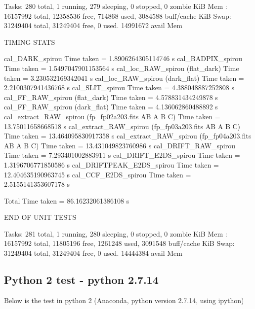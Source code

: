 \begin{cmdboxprint}
Tasks: 280 total,   1 running, 279 sleeping,   0 stopped,   0 zombie
KiB Mem : 16157992 total, 12358536 free,   714868 used,  3084588 buff/cache
KiB Swap: 31249404 total, 31249404 free,        0 used. 14991672 avail Mem

TIMING STATS

cal_DARK_spirou Time taken = 1.8906264305114746 s
cal_BADPIX_spirou Time taken = 1.5497047901153564 s
cal_loc_RAW_spirou (flat_dark) Time taken = 3.230532169342041 s
cal_loc_RAW_spirou (dark_flat) Time taken = 2.2100307941436768 s
cal_SLIT_spirou Time taken = 4.388048887252808 s
cal_FF_RAW_spirou (flat_dark) Time taken = 4.578831434249878 s
cal_FF_RAW_spirou (dark_flat) Time taken = 4.136062860488892 s
cal_extract_RAW_spirou (fp_fp02a203.fits AB A B C) Time taken = 13.75011658668518 s
cal_extract_RAW_spirou (fp_fp03a203.fits AB A B C) Time taken = 13.464095830917358 s
cal_extract_RAW_spirou (fp_fp04a203.fits AB A B C) Time taken = 13.431049823760986 s
cal_DRIFT_RAW_spirou Time taken = 7.293401002883911 s
cal_DRIFT_E2DS_spirou Time taken = 1.3196706771850586 s
cal_DRIFTPEAK_E2DS_spirou Time taken = 12.404635190963745 s
cal_CCF_E2DS_spirou Time taken = 2.5155141353607178 s

Total Time taken = 86.16232061386108 s

END OF UNIT TESTS

Tasks: 281 total,   1 running, 280 sleeping,   0 stopped,   0 zombie
KiB Mem : 16157992 total, 11805196 free,  1261248 used,  3091548 buff/cache
KiB Swap: 31249404 total, 31249404 free,        0 used. 14444384 avail Mem
\end{cmdboxprint}

\subsection{Python 2 test - python 2.7.14}

Below is the test in python 2 (Anaconda, python version 2.7.14, using ipython)

